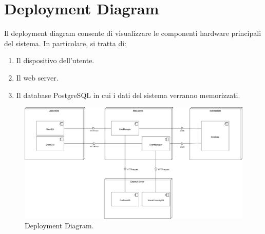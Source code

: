 \section{Deployment Diagram}
Il deployment diagram consente di visualizzare le componenti hardware principali del sistema.
In particolare, si tratta di:
\begin{enumerate}
	\item Il dispositivo dell'utente.
	\item Il web server.
	\item Il database PostgreSQL in cui i dati del sistema verranno memorizzati.
\end{enumerate}

\begin{figure}[h!]
	\centering
	\includegraphics[width=0.8\linewidth]{Iterazione 1/diagrammi/Deployment.drawio.png}
	\caption{Deployment Diagram.}
	\label{fig:DeploymentDiagram}
\end{figure}
